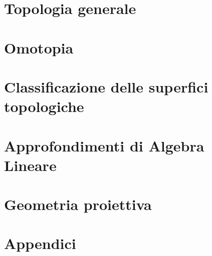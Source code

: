\documentclass[a4paper, 11pt, twoside, openright, italian]{memoir}
\begin{document}
\frontmatter

%


\mainmatter

\part{Topologia generale}






\part{Omotopia}


\part{Classificazione delle superfici topologiche}

\part{Approfondimenti di Algebra Lineare}

\part{Geometria proiettiva}


\appendix
\part{Appendici}



%
%
\backmatter

\end{document}
